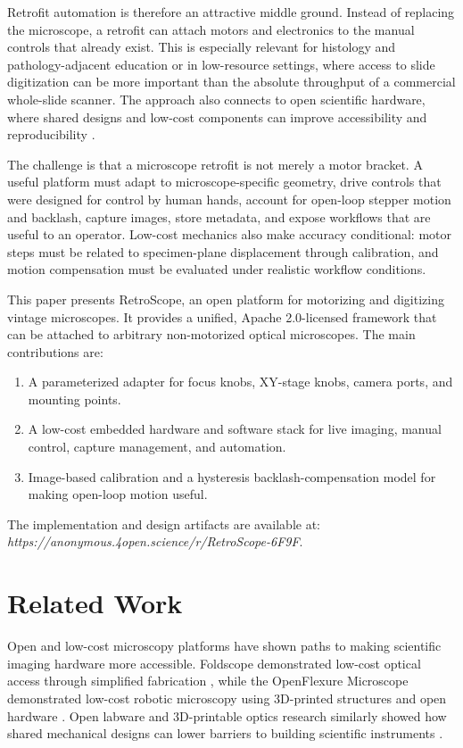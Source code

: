 \documentclass[runningheads]{llncs}
\begin{document}
Retrofit automation is therefore an attractive middle ground. Instead of replacing the microscope, a retrofit can attach motors and electronics to the manual controls that already exist. This is especially relevant for histology and pathology-adjacent education or in low-resource settings, where access to slide digitization can be more important than the absolute throughput of a commercial whole-slide scanner. The approach also connects to open scientific hardware, where shared designs and low-cost components can improve accessibility and reproducibility \cite{pearce2012openhardware,baden2015openlabware}.

The challenge is that a microscope retrofit is not merely a motor bracket. A useful platform must adapt to microscope-specific geometry, drive controls that were designed for control by human hands, account for open-loop stepper motion and backlash, capture images, store metadata, and expose workflows that are useful to an operator. Low-cost mechanics also make accuracy conditional: motor steps must be related to specimen-plane displacement through calibration, and motion compensation must be evaluated under realistic workflow conditions.

This paper presents RetroScope, an open platform for motorizing and digitizing vintage microscopes. It provides a unified, Apache 2.0-licensed framework that can be attached to arbitrary non-motorized optical microscopes. The main contributions are:
\begin{enumerate}
    \item A parameterized adapter for focus knobs, XY-stage knobs, camera ports, and mounting points.
    \item A low-cost embedded hardware and software stack for live imaging, manual control, capture management, and automation.
    \item Image-based calibration and a hysteresis backlash-compensation model for making open-loop motion useful.
\end{enumerate}
The implementation and design artifacts are available at: \\
\textit{https://anonymous.4open.science/r/RetroScope-6F9F}.

\section{Related Work}

Open and low-cost microscopy platforms have shown paths to making scientific imaging hardware more accessible. Foldscope demonstrated low-cost optical access through simplified fabrication \cite{cybulski2014foldscope}, while the OpenFlexure Microscope demonstrated low-cost robotic microscopy using 3D-printed structures and open hardware \cite{collins2020openflexure}. Open labware and 3D-printable optics research similarly showed how shared mechanical designs can lower barriers to building scientific instruments \cite{baden2015openlabware,zhang2013opensourceoptics}.
\end{document}

